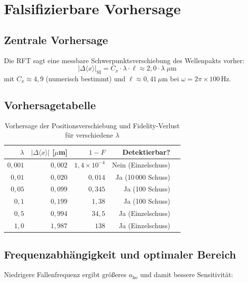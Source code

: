\documentclass[a4paper,11pt]{article}
\begin{document}
\section{Falsifizierbare Vorhersage}

\subsection{Zentrale Vorhersage}

Die RFT sagt eine messbare Schwerpunktsverschiebung des Wellenpakts vorher:
\[
  \boxed{|\Delta\langle x\rangle|_{\mathrm{SI}}
  = C_x \cdot \lambda \cdot \ell
  \approx 2{,}0 \cdot \lambda\;\mu\mathrm{m}}
\]
mit $C_x \approx 4{,}9$ (numerisch bestimmt) und
$\ell \approx 0{,}41\,\mu\mathrm{m}$ bei $\omega = 2\pi \times 100\,\mathrm{Hz}$.

\subsection{Vorhersagetabelle}

\begin{table}[h]
\centering
\caption{Vorhersage der Positionsverschiebung und Fidelity-Verlust für verschiedene $\lambda$}
\begin{tabular}{rrrrl}
\toprule
$\lambda$ & $|\Delta\langle x\rangle|$ [$\mu$m] & $1 - F$ & Detektierbar? \\
\midrule
$0{,}001$ & $0{,}002$ & $1{,}4 \times 10^{-4}$ & Nein (Einzelschuss) \\
$0{,}01$  & $0{,}020$ & $0{,}014$               & Ja (10\,000 Schuss) \\
$0{,}05$  & $0{,}099$ & $0{,}345$               & Ja (100 Schuss) \\
$0{,}1$   & $0{,}199$ & $1{,}38$                & Ja (100 Schuss) \\
$0{,}5$   & $0{,}994$ & $34{,}5$                & Ja (Einzelschuss) \\
$1{,}0$   & $1{,}987$ & $138$                   & Ja (Einzelschuss) \\
\bottomrule
\end{tabular}
\end{table}

\subsection{Frequenzabhängigkeit und optimaler Bereich}

Niedrigere Fallenfrequenz ergibt größeres $a_{\mathrm{ho}}$ und damit
bessere Sensitivität:
\end{document}
